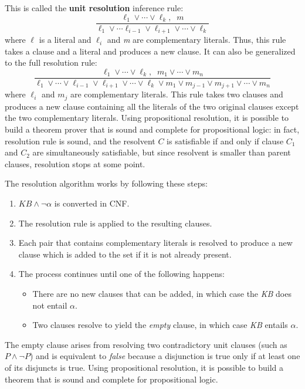 \documentclass{article}
\begin{document}
This is called the \textbf{unit resolution} inference rule:
$$\frac{\ell_1 \vee \cdots \vee \ell_k,\;\; m}{\ell_1\vee \cdots \ell_{i-1}\vee\ell_{i+1}\vee \cdots \vee \ell_k}$$
where $\ell$ is a literal and $\ell_i$ and \textit{m} are complementary literals. Thus, this rule takes a clause and a literal and produces a new clause. It can also be generalized to the full resolution rule:
$$\frac{\ell_1\vee\cdots\vee\ell_k,\;\; m_1\vee\cdots\vee m_n}{\ell_1\vee\cdots\vee\ell_{i-1}\vee\ell_{i+1}\vee\cdots\vee\ell_k\vee m_1 \vee m_{j-1}\vee m_{j+1}\vee\cdots\vee m_n}$$
where $\ell_i$ and $m_j$ are complementary literals. This rule takes two clauses and produces a new clause containing all the literals of the two original clauses except the two complementary literals. Using propositional resolution, it is possible to build a theorem prover that is sound and complete for propositional logic: in fact, resolution rule is sound, and the resolvent $C$ is satisfiable if and only if clause $C_1$ and $C_2$ are simultaneously satisfiable, but since resolvent is smaller than parent clauses, resolution stops at some point.

The resolution algorithm works by following these steps:
\begin{enumerate}
    \item $KB \land \neg \alpha$ is converted in CNF.
    \item The resolution rule is applied to the resulting clauses.
    \item Each pair that contains complementary literals is resolved to produce a new clause which is added to the set if it is not already present.
    \item The process continues until one of the following happens:
    \begin{itemize}
        \item There are no new clauses that can be added, in which case the \textit{KB} does not entail $\alpha$.
        \item Two clauses resolve to yield the \textit{empty} clause, in which case \textit{KB} entails $\alpha$.
    \end{itemize}
\end{enumerate}

The empty clause arises from resolving two contradictory unit clauses (such as $P \land \neg P$) and is equivalent to \textit{false} because a disjunction is true only if at least one of its disjuncts is true. Using propositional resolution, it is possible to build a theorem that is sound and complete for propositional logic.
\end{document}
